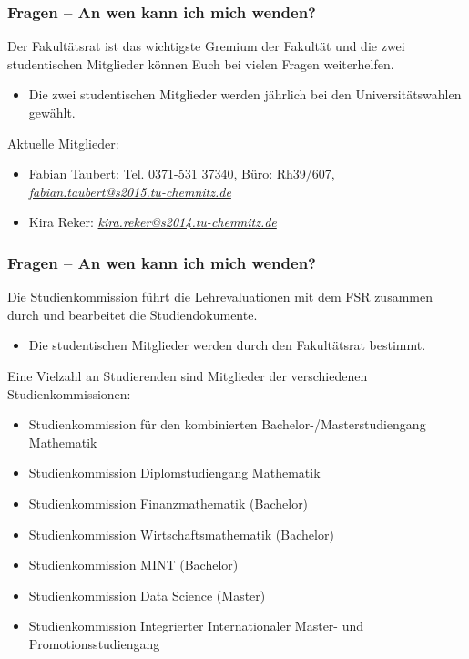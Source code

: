 \documentclass[10pt]{beamer}
\begin{document}
\begin{frame}
\frametitle{Fragen -- An wen kann ich mich wenden?}
\begin{block}{\vphantom{X}}
	Der Fakultätsrat ist das wichtigste Gremium der Fakultät und die zwei studentischen Mitglieder können Euch bei vielen Fragen weiterhelfen.
\end{block}
\begin{itemize}
	\item Die zwei studentischen Mitglieder werden jährlich bei den Universitätswahlen gewählt.
\end{itemize}
Aktuelle Mitglieder:
\begin{itemize}
	\item Fabian Taubert: Tel. 0371-531 37340, Büro: Rh39/607, \textit{\href{mailto:fabian.taubert@s2015.tu-chemnitz.de}{fabian.taubert@s2015.tu-chemnitz.de}}
	\item Kira Reker: \textit{\href{mailto:kira.reker@s2014.tu-chemnitz.de}{kira.reker@s2014.tu-chemnitz.de}}   
\end{itemize}
\end{frame}

\begin{frame}
\frametitle{Fragen -- An wen kann ich mich wenden?}
\begin{block}{\vphantom{X}}
	Die Studienkommission führt die Lehrevaluationen mit dem FSR zusammen durch und bearbeitet die Studiendokumente.
\end{block}
\begin{itemize}
	\item Die studentischen Mitglieder werden durch den Fakultätsrat bestimmt.
\end{itemize}
Eine Vielzahl an Studierenden sind Mitglieder der verschiedenen Studienkommissionen:
\begin{itemize}
	\item Studienkommission für den kombinierten Bachelor-/Masterstudiengang Mathematik  
	\item Studienkommission Diplomstudiengang Mathematik  
	\item Studienkommission Finanzmathematik (Bachelor)
	\item Studienkommission Wirtschaftsmathematik (Bachelor)
	\item Studienkommission MINT (Bachelor)
	\item Studienkommission Data Science (Master)
	\item Studienkommission Integrierter Internationaler Master- und Promotionsstudiengang
\end{itemize}
\end{frame}
\end{document}
